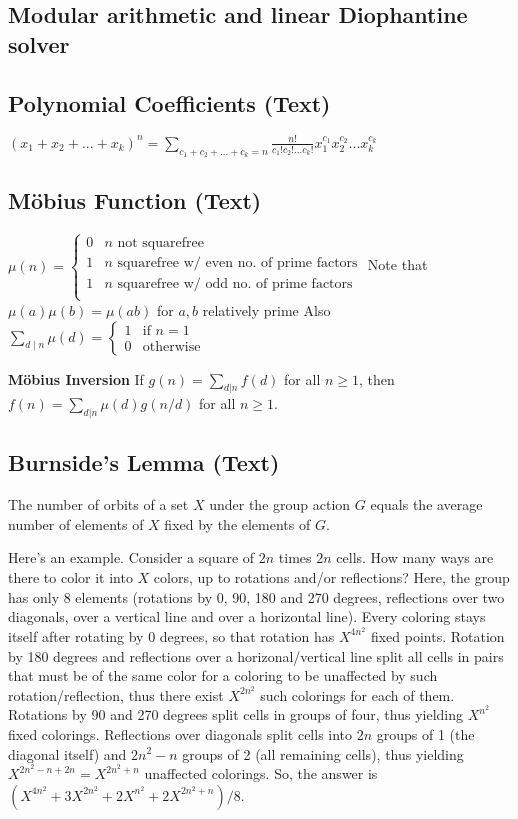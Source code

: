 \documentclass[12pt]{extarticle}
\begin{document}
\begin{multicols*}{2}
\subsection{Modular arithmetic and linear Diophantine solver} %


\subsection{Polynomial Coefficients (Text)} %
$(x_1 + x_2 + ... + x_k)^n = \sum_{c_1 + c_2 + ... + c_k = n}
\frac{n!}{c_1! c_2! ... c_k!} x_1^{c_1} x_2^{c_2} ... x_k^{c_k}$

\subsection{M\"obius Function (Text)} %
$\mu(n) = \begin{cases}
0 & \text{$n$ not squarefree} \\
1 & \text{$n$ squarefree w/ even no. of prime factors} \\
1 & \text{$n$ squarefree w/ odd no. of prime factors} \\
\end{cases}$
Note that $\mu(a) \mu(b) = \mu(ab)$ for $a, b$ relatively prime
Also $\sum_{d \mid n} \mu(d) = \begin{cases} 1 & \text{if $n = 1$} \\
0 & \text{otherwise} \end{cases}$

\textbf{M\"obius Inversion}
If $g(n) = \sum_{d|n} f(d)$ for all $n \ge 1$, then
$f(n) = \sum_{d|n} \mu(d)g(n/d)$ for all $n \ge 1$.


\subsection{Burnside's Lemma (Text)} %
The number of orbits of a set $X$ under the group action $G$ equals the average
number of elements of $X$ fixed by the elements of $G$.

Here's an example. Consider a square of $2n$ times $2n$ cells. How many ways
are there to color it into $X$ colors, up to rotations and/or reflections?
Here, the group has only 8 elements (rotations by 0, 90, 180 and 270 degrees,
reflections over two diagonals, over a vertical line and over a horizontal
line). Every coloring stays itself after rotating by 0 degrees, so that
rotation has $X^{4n^2}$ fixed points. Rotation by 180 degrees and reflections
over a horizonal/vertical line split all cells in pairs that must be of the
same color for a coloring to be unaffected by such rotation/reflection, thus
there exist $X^{2n^2}$ such colorings for each of them. Rotations by 90 and 270
degrees split cells in groups of four, thus yielding $X^{n^2}$ fixed colorings.
Reflections over diagonals split cells into $2n$ groups of 1 (the diagonal
itself) and $2n^2-n$ groups of 2 (all remaining cells), thus yielding
$X^{2n^2-n+2n}=X^{2n^2+n}$ unaffected colorings.  So, the answer is
$(X^{4n^2}+3X^{2n^2}+2X^{n^2}+2X^{2n^2+n})/8$.


\end{multicols*}
\end{document}
